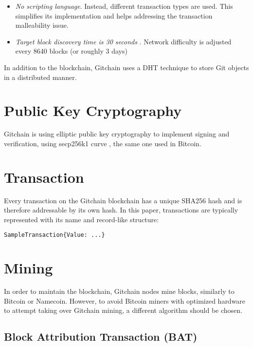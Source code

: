 \documentclass[a4paper]{article}
\begin{document}
\begin{itemize}
\item \emph{No scripting language}. Instead, different transaction types are used. This simplifies its implementation and helps addressing the transaction malleability \cite{txnmal} issue.
\item \emph{Target block discovery time is 30 seconds }. Network difficulty is adjusted every 8640 blocks (or roughly 3 days) 
\end{itemize}

In addition to the blockchain, Gitchain uses a DHT technique to store Git objects in a distributed manner.

\section{Public Key Cryptography}

Gitchain is using elliptic public key cryptography to implement signing and verification, using secp256k1 curve , the same one used in
Bitcoin.

\section{Transaction}

Every transaction on the Gitchain blockchain has a unique SHA256 hash and is therefore addressable by its own hash. In this paper, transactions are typically represented with its name and record-like structure:

\begin{verbatim}
SampleTransaction{Value: ...}
\end{verbatim}

\section{Mining}

In order to maintain the blockchain, Gitchain nodes mine blocks, similarly to Bitcoin or Namecoin. However, to avoid Bitcoin miners
with optimized hardware to attempt taking over Gitchain mining, a different algorithm should be chosen.

\subsection{Block Attribution Transaction (BAT)}
\end{document}
